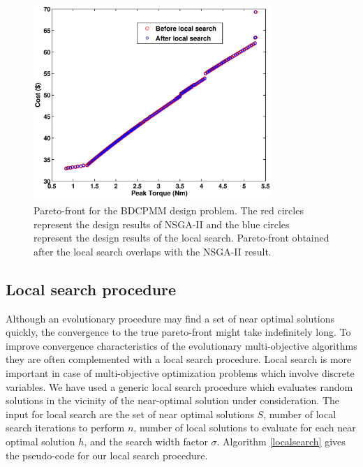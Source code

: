 \begin{figure}[ht]\begin{center}
 \includegraphics[width=90mm, height=75mm]{dia/nsplsp.eps} 
 \caption{Pareto-front for the BDCPMM design problem. The red circles represent the design results of NSGA-II and the blue circles represent the design results of the local search. Pareto-front obtained after the local search overlaps with the NSGA-II result.}
 \label{nsplsp}
\end{center}\end{figure}


\subsection{Local search procedure}
Although an evolutionary procedure may find a set of near optimal solutions
quickly, the convergence to the true pareto-front might take indefinitely
long. To improve convergence characteristics of the evolutionary
multi-objective algorithms they are often complemented with a local search
procedure. Local search is more important in case of multi-objective
optimization problems which involve discrete variables.  We have used a
generic local search procedure which evaluates random solutions in the
vicinity of the near-optimal solution under consideration. The input for
local search are the set of near optimal solutions $S$, number of local
search iterations to perform $n$, number of local solutions to evaluate for
each near optimal solution $h$, and the search width factor
$\sigma$. Algorithm \ref{localsearch} gives the pseudo-code for our local
search procedure.

